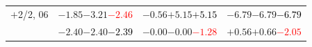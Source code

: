 \documentclass[compress]{beamer}
\begin{document}
\begin{frame}
\begin{tabular}{r | c | c | c}
$+$2/2, 06 & $-1.85$\hspace{0.1 cm}$-3.21$\hspace{0.1 cm}\textcolor{red}{$-2.46$} & $-0.56$\hspace{0.1 cm}$+5.15$\hspace{0.1 cm}\textcolor{black}{$+5.15$} & $-6.79$\hspace{0.1 cm}$-6.79$\hspace{0.1 cm}\textcolor{black}{$-6.79$} \\
           & $-2.40$\hspace{0.1 cm}$-2.40$\hspace{0.1 cm}\textcolor{black}{$-2.39$} & $-0.00$\hspace{0.1 cm}$-0.00$\hspace{0.1 cm}\textcolor{red}{$-1.28$} & $+0.56$\hspace{0.1 cm}$+0.66$\hspace{0.1 cm}\textcolor{red}{$-2.05$} \\
\end{tabular}
\end{frame}
\end{document}
